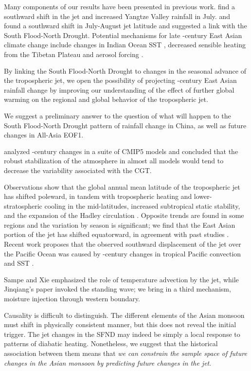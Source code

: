 	Many components of our results have been presented in previous work. \citet{Xuan2011} find a southward shift in the jet and increased Yangtze Valley rainfall in July. \citet{Yu2004} and \citet{Yu2007} found a southward shift in July-August jet latitude and suggested a link with the South Flood-North Drought. Potential mechanisms for late -century East Asian climate change include changes in Indian Ocean SST \citep{Qu2012}, decreased sensible heating from the Tibetan Plateau \citep{Liu2012a,Hu2015} and aerosol forcing \citep{Song2014}.
	
	By linking the South Flood-North Drought to changes in the seasonal advance of the tropospheric jet, we open the possibility of projecting -century East Asian rainfall change by improving our understanding of the effect of further global warming on the regional and global behavior of the tropospheric jet.
	
	
	We suggest a preliminary answer to the question of what will happen to the South Flood-North Drought pattern of rainfall change in China, as well as future changes in All-Asia EOF1.
	
	\citet{Lee2014} analyzed -century changes in a suite of CMIP5 models and concluded that the robust stabilization of the atmosphere in almost all models would tend to decrease the variability associated with the CGT. 
	
	Observations show that the global annual mean latitude of the tropospheric jet has shifted poleward, in tandem with tropospheric heating and lower-stratospheric cooling in the mid-latitudes, increased subtropical static stability, and the expansion of the Hadley circulation \citep{Fu2006,Archer2008,Fu2011}. Opposite trends are found in some regions and the variation by season is significant; we find that the East Asian portion of the jet has shifted equatorward, in agreement with past studies \citep{Yu2007, Archer2008}. Recent work proposes that the observed southward displacement of the jet over the Pacific Ocean was caused by -century changes in tropical Pacific convection and SST \citep{Park2014a}. 

	Sampe and Xie emphasized the role of temperature advection by the jet, while Jinqiang's paper invoked the standing wave; we bring in a third mechanism, moisture injection through western boundary.
	
	Causality is difficult to distinguish. The different elements of the Asian monsoon must shift in physically consistent manner, but this does not reveal the initial trigger. The jet changes in the SFND may indeed be simply a local response to patterns of diabatic heating. Nonetheless, we suggest that the historical association between them means that \textit{we can constrain the sample space of future changes in the Asian monsoon by predicting future changes in the jet}.
	
